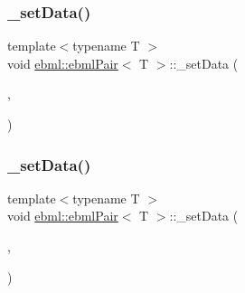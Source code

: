 \mbox{\label{classebml_1_1ebmlPair_a3cc1fdcae7b1f0b39998735b2802e91e}} 
\subsubsection{\texorpdfstring{\+\_\+set\+Data()}{\_setData()}\hspace{0.1cm}{\footnotesize\ttfamily [4/5]}}
{\footnotesize\ttfamily template$<$typename T $>$ \\
void \mbox{\hyperlink{classebml_1_1ebmlPair}{ebml\+::ebml\+Pair}}$<$ T $>$\+::\+\_\+set\+Data (\begin{DoxyParamCaption}\item[{const T \&}]{,  }\item[{\mbox{\hyperlink{namespaceebml_adad533b7705a16bb360fe56380c5e7be}{ebml\+Element\+\_\+sp}} \&\&}]{ }\end{DoxyParamCaption})\hspace{0.3cm}{\ttfamily [protected]}}

\mbox{\label{classebml_1_1ebmlPair_acba0d25b5f3882ad2c80bbbb2f135336}} 
\subsubsection{\texorpdfstring{\+\_\+set\+Data()}{\_setData()}\hspace{0.1cm}{\footnotesize\ttfamily [5/5]}}
{\footnotesize\ttfamily template$<$typename T $>$ \\
void \mbox{\hyperlink{classebml_1_1ebmlPair}{ebml\+::ebml\+Pair}}$<$ T $>$\+::\+\_\+set\+Data (\begin{DoxyParamCaption}\item[{T \&\&}]{,  }\item[{\mbox{\hyperlink{namespaceebml_adad533b7705a16bb360fe56380c5e7be}{ebml\+Element\+\_\+sp}} \&\&}]{ }\end{DoxyParamCaption})\hspace{0.3cm}{\ttfamily [protected]}}

\mbox{\label{classebml_1_1ebmlPair_a6974cf70949c7e2a53754b7fb71d8a72}} 
